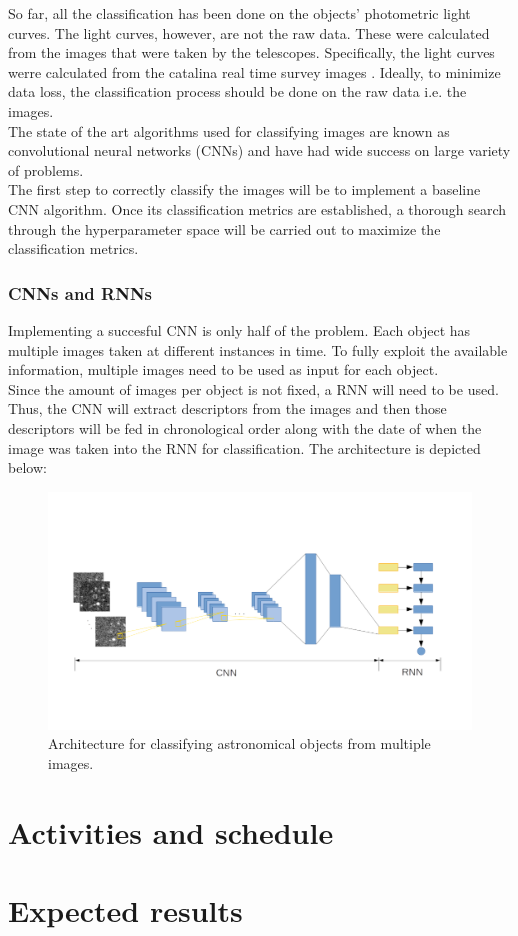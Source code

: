 So far, all the classification has been done on the objects' photometric light curves. The light curves, however, are not the raw data. These were calculated from the images that were taken by the telescopes. Specifically, the light curves werre calculated from the catalina real time survey images \cite{catalinaImages}. Ideally, to minimize data loss, the classification process should be done on the raw data i.e. the images.\\ 

The state of the art algorithms used for classifying images are known as convolutional neural networks (CNNs) \cite{CNN} and have had wide success on large variety of problems.\\

The first step to correctly classify the images will be to implement a baseline CNN algorithm. Once its classification  metrics are established, a thorough search through the hyperparameter space will be carried out to maximize the classification metrics.

\subsubsection{CNNs and RNNs}

Implementing a succesful CNN is only half of the problem. Each object has multiple images taken at different instances in time. To fully exploit the available information, multiple images need to be used as input for each object.\\

Since the amount of images per object is not fixed, a RNN will need to be used. Thus, the CNN will extract descriptors from the images and then those descriptors will be fed in chronological order along with the date of when the image was taken into the RNN for classification. The architecture is depicted below:

\begin{figure}[H]
  \centering
  \includegraphics[width=1.05\textwidth]{CNNRNNDiagram.png}
  \caption{Architecture for classifying astronomical objects from multiple images.}
\end{figure}

\section{Activities and schedule}


\section{Expected results}


\newpage
\printbibliography

